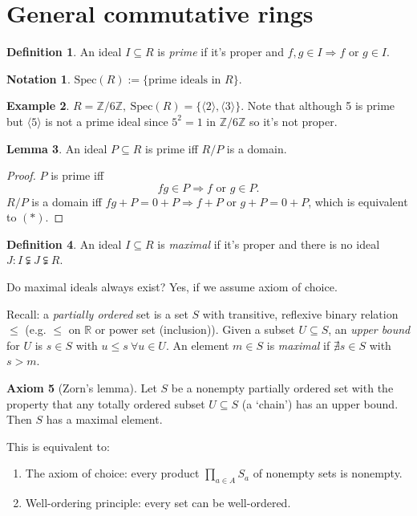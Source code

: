 \documentclass[a4paper]{article}
\newcommand{\Spec}{\text{Spec}}
\theoremstyle{definition}
\newtheorem{defn}{Definition}[subsection]
\newtheorem{lemma}[defn]{Lemma}
\newtheorem{example}[defn]{Example}
\newtheorem{axiom}[defn]{Axiom}
\newtheorem*{notation}{Notation}
\begin{document}
\section{General commutative rings}
\begin{defn}
An ideal $I\subseteq R$ is \textit{prime} if it's proper and $f,g\in I\Rightarrow f$ or $g\in I$.
\end{defn}
\begin{notation}
$\Spec(R):=\{\text{prime ideals in }R\}$.
\end{notation}
\begin{example}
$R=\mathbb Z/6\mathbb Z,\ \Spec(R)=\{\langle 2\rangle,\langle 3\rangle\}$.  Note that although 5 is prime but $\langle 5\rangle$ is not a prime ideal since $5^2=1$ in $\mathbb Z/6\mathbb Z$ so it's not proper.
\end{example}
\begin{lemma}
An ideal $P\subseteq R$ is prime iff $R/P$ is a domain.
\end{lemma}
\begin{proof}
$P$ is prime iff
\[
fg\in P\Rightarrow f \text{ or } g\in P. \tag{$\ast$}
\]
$R/P$ is a domain iff $fg+P=0+P \Rightarrow f+P$ or $g+P=0+P$, which is equivalent to $(\ast)$.
\end{proof}

\begin{defn}
An ideal $I\subseteq R$ is \textit{maximal} if it's proper and there is no ideal $J:I\subsetneqq J\subsetneqq R$.
\end{defn}

Do maximal ideals always exist? Yes, if we assume axiom of choice.

Recall: a \textit{partially ordered} set is a set $S$ with transitive, reflexive binary relation $\leq$ (e.g. $\leq$ on $\mathbb R$ or power set (inclusion)). Given a subset $U\subseteq S$, an \textit{upper bound} for $U$ is $s\in S$ with $u\leq s \ \forall u\in U$. An element $m\in S$ is \textit{maximal} if $\nexists s\in S$ with $s>m$.

\begin{axiom}[Zorn's lemma]
Let $S$ be a nonempty partially ordered set with the property that any totally ordered subset $U\subseteq S$ (a `chain') has an upper bound. Then $S$ has a maximal element.
\end{axiom}

This is equivalent to:
\begin{enumerate}
\item The axiom of choice: every product $\prod_{a\in A} S_a$ of nonempty sets is nonempty.
\item Well-ordering principle: every set can be well-ordered.
\end{enumerate}
\end{document}
